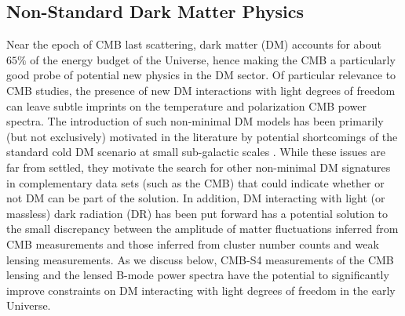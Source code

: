 \subsection{Non-Standard Dark Matter Physics}

Near the epoch of CMB last scattering, dark matter (DM) accounts for about $65\%$ of the energy budget of the Universe, hence making the CMB a particularly good probe of potential new physics in the DM sector. Of particular relevance to CMB studies, the presence of new DM interactions with light degrees of freedom \cite{Goldberg:1986nk,1992ApJ...398...43C,1992ApJ...398..407G,1994ApJ...431...41M,1995ApJ...452..495D,AtrioBarandela:1996ur,Green:2005fa,Profumo:2006bv,Bringmann:2009vf,Boehm:2001hm,Mangano:2006mp,Serra:2009uu,McDermott:2010pa,Aarssen:2012fx,Wilkinson:2013kia,Wilkinson:2014ksa,Dvorkin:2013cea,Boehm:2014vja,Escudero:2015yka,Foot:2004pa,Ackerman:2008gi, ArkaniHamed:2008qn,Feng:2009mn,Kaplan:2009de,Behbahani:2010xa,Kaplan:2011yj,Aarssen:2012fx,Cline:2012is,Hooper:2012cw,Das:2012aa,Cyr-Racine:2013ab,Diamanti:2012tg,Baldi:2012ua,Fan:2013yva,Fan:2013tia,McCullough:2013jma,Cyr-Racine:2013fsa,Cline:2013pca,Cline:2013zca,Bringmann:2013vra,Chu:2014lja,Archidiacono:2014nda,Randall:2014kta,Buen-Abad:2015ova,Lesgourgues:2015wza,Choquette:2015mca} can leave subtle imprints on the temperature and polarization CMB power spectra. The introduction of such non-minimal DM models has been primarily (but not exclusively) motivated in the literature by potential shortcomings of the standard cold DM scenario at small sub-galactic scales \cite{deBlok:1997zlw,Klypin:1999uc,Moore:1999aa,Zavala:2009ms,Oh:2010ea,BoylanKolchin:2011de,Papastergis:2011xe,Walker:2011zu,Pawlowski01112013,Klypin:2014ira,Oman:2015xda,Papastergis2015de}. While these issues are far from settled, they motivate the search for other non-minimal DM signatures in complementary data sets (such as the CMB) that could indicate whether or not DM can be part of the solution. In addition, DM interacting with light (or massless) dark radiation (DR) has been put forward \cite{Buen-Abad:2015ova,Lesgourgues:2015wza} has a potential solution to the small discrepancy between the amplitude of matter fluctuations inferred from CMB measurements and those inferred from cluster number counts and weak lensing measurements. As we discuss below, CMB-S4 measurements of the CMB lensing and the lensed B-mode power spectra have the potential to significantly improve constraints on DM interacting with light degrees of freedom in the early Universe.

